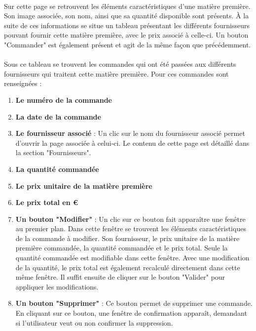 \paragraph{}
Sur cette page se retrouvent les éléments caractéristiques d'une matière
première. Son image associée, son nom, ainsi que sa quantité disponible sont
présents. À la suite de ces informations se situe un tableau présentant les
différents fournisseurs pouvant fournir cette matière première, avec le prix
associé à celle-ci. Un bouton "Commander" est également présent et agit de la
même façon que précédemment.

\paragraph{}
Sous ce tableau se trouvent les commandes qui ont été passées aux différents
fournisseurs qui traitent cette matière première. Pour ces commandes sont
renseignées :
\begin{enumerate}
  \item \textbf{Le numéro de la commande}
  \item \textbf{La date de la commande}
  \item \textbf{Le fournisseur associé} : Un clic sur le nom du fournisseur
  associé permet d'ouvrir la page associée à celui-ci. Le contenu de cette page
  est détaillé dans la section "Fournisseurs".
  \item \textbf{La quantité commandée}
  \item \textbf{Le prix unitaire de la matière première}
  \item \textbf{Le prix total en €}
  \item \textbf{Un bouton "Modifier"} : Un clic sur ce bouton fait apparaître
  une fenêtre au premier plan. Dans cette fenêtre se trouvent les éléments
  caractéristiques de la commande à modifier. Son fournisseur, le prix unitaire
  de la matière première commandée, la quantité commandée et le prix total.
  Seule la quantité commandée est modifiable dans cette fenêtre. Avec une
  modification de la quantité, le prix total est également recalculé
  directement dans cette même fenêtre. Il suffit ensuite de cliquer sur le
  bouton "Valider" pour appliquer les modifications.

  \item \textbf{Un bouton "Supprimer"} : Ce bouton permet de supprimer une
  commande. En cliquant sur ce bouton, une fenêtre de confirmation apparaît,
  demandant si l'utilisateur veut ou non confirmer la suppression.
\end{enumerate}

